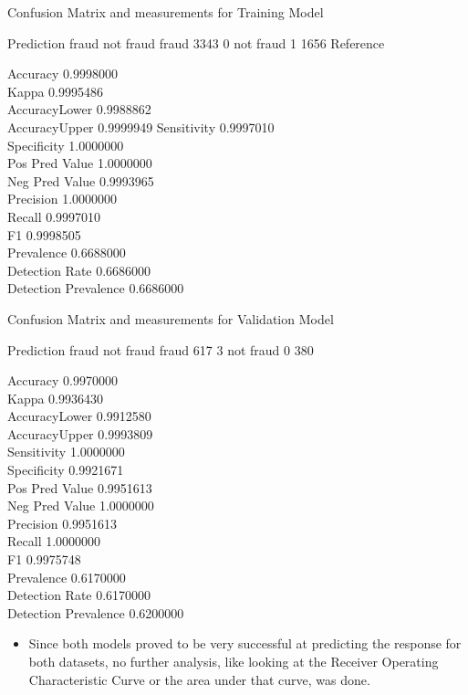 \documentclass[
]{article}
\providecommand{\tightlist}{%
  \setlength{\itemsep}{0pt}\setlength{\parskip}{0pt}}
\begin{document}
Confusion Matrix and measurements for Training Model

Prediction fraud not fraud fraud 3343 0 not fraud 1 1656 Reference

Accuracy 0.9998000\\
Kappa 0.9995486\\
AccuracyLower 0.9988862\\
AccuracyUpper 0.9999949 Sensitivity 0.9997010\\
Specificity 1.0000000\\
Pos Pred Value 1.0000000\\
Neg Pred Value 0.9993965\\
Precision 1.0000000\\
Recall 0.9997010\\
F1 0.9998505\\
Prevalence 0.6688000\\
Detection Rate 0.6686000\\
Detection Prevalence 0.6686000

Confusion Matrix and measurements for Validation Model

Prediction fraud not fraud fraud 617 3 not fraud 0 380

Accuracy 0.9970000\\
Kappa 0.9936430\\
AccuracyLower 0.9912580\\
AccuracyUpper 0.9993809\\
Sensitivity 1.0000000\\
Specificity 0.9921671\\
Pos Pred Value 0.9951613\\
Neg Pred Value 1.0000000\\
Precision 0.9951613\\
Recall 1.0000000\\
F1 0.9975748\\
Prevalence 0.6170000\\
Detection Rate 0.6170000\\
Detection Prevalence 0.6200000

\begin{itemize}
\tightlist
\item
  Since both models proved to be very successful at predicting the
  response for both datasets, no further analysis, like looking at the
  Receiver Operating Characteristic Curve or the area under that curve,
  was done.
\end{itemize}
\end{document}
